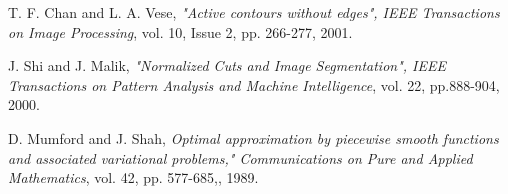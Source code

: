 \documentclass{article}
\begin{document}
  
  \begin{thebibliography}{9}
    
    \bibitem{[ChanVese01]}
    T. F. Chan and L. A. Vese,
    \emph{"Active contours without edges", IEEE Transactions on Image Processing},
    vol. 10, Issue 2, pp. 266-277, 2001.
    
    
    \bibitem{[ShiMalik00]}
    J.  Shi  and  J.  Malik,
    \emph{"Normalized Cuts and Image Segmentation", IEEE Transactions on Pattern Analysis and Machine Intelligence},
    vol. 22, pp.888-904,
    2000.
    
    \bibitem{[MumfordShah89]}
    D. Mumford and J. Shah,
    \emph{Optimal approximation by piecewise smooth functions and associated
      variational problems," Communications on Pure and Applied Mathematics},
    vol. 42, pp. 577-685,,
    1989.
    
  \end{thebibliography}
  
\end{document}
